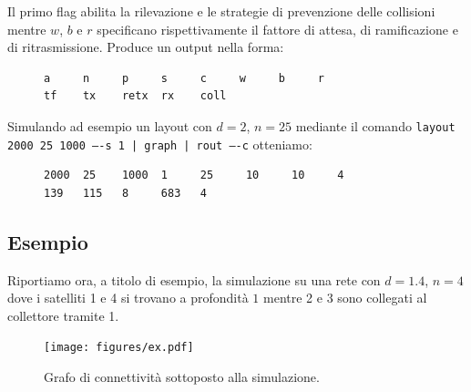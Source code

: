 \documentclass[a4paper,11pt]{article}
\theoremstyle{definition}
\begin{document}
Il primo flag abilita la rilevazione e le strategie di prevenzione delle collisioni mentre $w$, $b$ e $r$ specificano rispettivamente il fattore di attesa, di ramificazione e di ritrasmissione. Produce un output nella forma:

\begin{figure}[H]
\centering
\begin{BVerbatim}
a     n     p     s     c     w     b     r
tf    tx    retx  rx    coll
\end{BVerbatim}
\end{figure}

Simulando ad esempio un layout con $d=2$, $n=25$ mediante il comando \texttt{layout 2000 25 1000 ----s 1 | graph | rout ----c} otteniamo:

\begin{figure}[H]
\centering
\begin{BVerbatim}
2000  25    1000  1     25     10     10     4
139   115   8     683   4
\end{BVerbatim}
\end{figure}

\subsection{Esempio}

Riportiamo ora, a titolo di esempio, la simulazione su una rete con $d=1.4$, $n=4$ dove i satelliti 1 e 4 si trovano a profondità $1$ mentre 2 e 3 sono collegati al collettore tramite 1.


\begin{figure}[H]
\centering
\texttt{[image: figures/ex.pdf]}
\caption{Grafo di connettività sottoposto alla simulazione.}
\end{figure}

\end{document}
